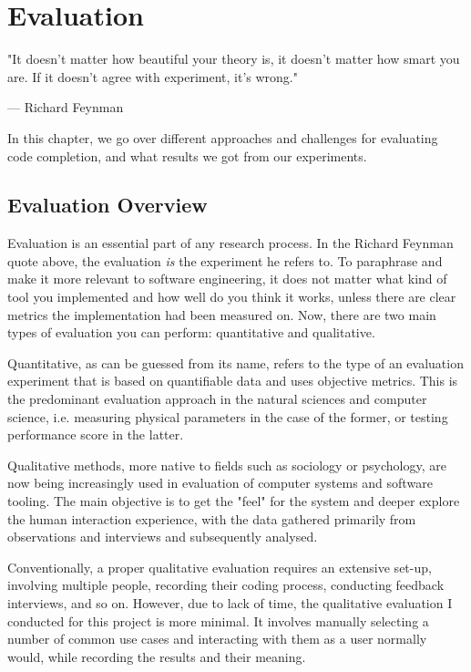 \chapter{Evaluation}
\label{chap:Evaluation}

\epigraph{"It doesn't matter how beautiful your theory is, it doesn't matter how smart you are. If it doesn't agree with experiment, it's wrong."}{--- \textup{Richard Feynman}}

In this chapter, we go over different approaches and challenges for evaluating code completion, and what results we got from our experiments.

\section{Evaluation Overview}
\label{sec:Evaluation-Overview}
Evaluation is an essential part of any research process. In the Richard Feynman quote above, the evaluation \textit{is} the experiment he refers to. To paraphrase and make it more relevant to software engineering, it does not matter what kind of tool you implemented and how well do you think it works, unless there are clear metrics the implementation had been measured on. Now, there are two main types of evaluation you can perform: quantitative and qualitative.

Quantitative, as can be guessed from its name, refers to the type of an evaluation experiment that is based on quantifiable data and uses objective metrics. This is the predominant evaluation approach in the natural sciences and computer science, i.e. measuring physical parameters in the case of the former, or testing performance score in the latter.

Qualitative methods, more native to fields such as sociology or psychology, are now being increasingly used in evaluation of computer systems and software tooling. The main objective is to get the "feel" for the system and deeper explore the human interaction experience, with the data gathered primarily from observations and interviews and subsequently analysed.

Conventionally, a proper qualitative evaluation requires an extensive set-up, involving multiple people, recording their coding process, conducting feedback interviews, and so on. However, due to lack of time, the qualitative evaluation I conducted for this project is more minimal. It involves manually selecting a number of common use cases and interacting with them as a user normally would, while recording the results and their meaning.

